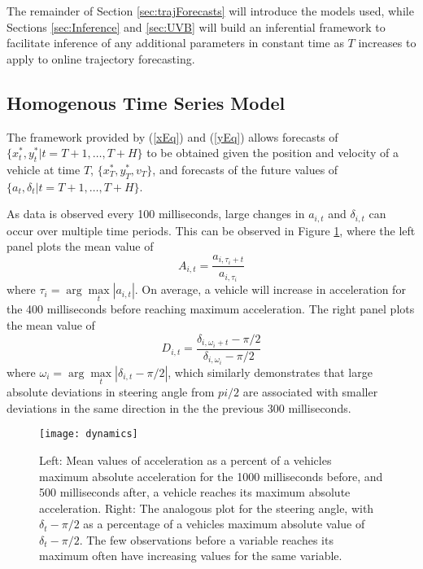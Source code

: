 \documentclass[12pt,a4paper]{article}\usepackage[]{graphicx}\usepackage[]{color}
\begin{document}
The remainder of Section \ref{sec:trajForecasts} will introduce the models used, while Sections \ref{sec:Inference} and \ref{sec:UVB} will build an inferential framework to facilitate inference of any additional parameters in constant time as $T$ increases to apply to online trajectory forecasting.

\subsection{Homogenous Time Series Model}
\label{subsec:homogenous}

The framework provided by (\ref{xEq}) and (\ref{yEq}) allows forecasts of $\{x^*_{t}, y^*_{t} | t = T + 1, \dots, T+H\}$ to be obtained given the position and velocity of a vehicle at time $T$, $\{x^*_T, y^*_T, v_T\}$, and forecasts of the future values of 
$\{a_{t}, \delta_{t} | t = T + 1, \dots, T+H\}$.  

As data is observed every 100 milliseconds, large changes in $a_{i, t}$ and $\delta_{i, t}$ can occur over multiple time periods. This can be observed in Figure \ref{fig:dynamics}, where the left panel plots the mean value of
\begin{equation}
A_{i, t} = \frac{a_{i, \tau_i + t}}{a_{i, \tau_i}}
\label{amax}
\end{equation}
where $\tau_i = \arg \underset{t}{\max}|a_{i, t}|$. On average, a vehicle will increase in acceleration for the 400 milliseconds before reaching maximum acceleration. The right panel plots the mean value of
\begin{equation}
D_{i, t} = \frac{\delta_{i, \omega_i + t} - \pi/2}{\delta_{i, \omega_i} - \pi/2}
\label{dmax}
\end{equation}
where $\omega_i = \arg \underset{t}{\max}|\delta_{i, t} - \pi/2|$, which similarly demonstrates that large absolute deviations in steering angle from $pi/2$ are associated with smaller deviations in the same direction in the the previous 300 milliseconds. 

\begin{figure}[h]
\centering
\texttt{[image: dynamics]}
\caption{Left: Mean values of acceleration as a percent of a vehicles maximum absolute acceleration for the 1000 milliseconds before, and 500 milliseconds after, a vehicle reaches its maximum absolute acceleration. Right: The analogous plot for the steering angle, with $\delta_t - \pi/2$ as a percentage of a vehicles maximum absolute value of $\delta_t - \pi/2$. The few observations before a variable reaches its maximum often have increasing values for the same variable.}
\label{fig:dynamics}
\end{figure}
\end{document}
